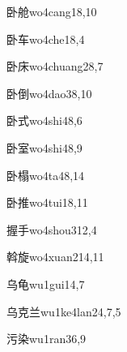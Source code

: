 \begin{entry}{卧舱}{wo4cang1}{8,10}
\end{entry}

\begin{entry}{卧车}{wo4che1}{8,4}
\end{entry}

\begin{entry}{卧床}{wo4chuang2}{8,7}
\end{entry}

\begin{entry}{卧倒}{wo4dao3}{8,10}
\end{entry}

\begin{entry}{卧式}{wo4shi4}{8,6}
\end{entry}

\begin{entry}{卧室}{wo4shi4}{8,9}
\end{entry}

\begin{entry}{卧榻}{wo4ta4}{8,14}
\end{entry}

\begin{entry}{卧推}{wo4tui1}{8,11}
\end{entry}

\begin{entry}{握手}{wo4shou3}{12,4}
\end{entry}

\begin{entry}{斡旋}{wo4xuan2}{14,11}
\end{entry}

\begin{entry}{乌龟}{wu1gui1}{4,7}
\end{entry}

\begin{entry}{乌克兰}{wu1ke4lan2}{4,7,5}
\end{entry}

\begin{entry}{污染}{wu1ran3}{6,9}
\end{entry}


